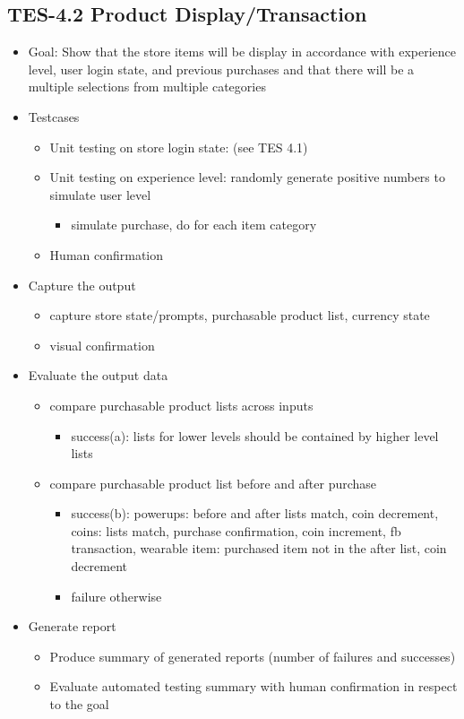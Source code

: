 \subsection{TES-4.2 Product Display/Transaction}
\begin{itemize}
\item Goal: Show that the store items will be display in accordance with experience level, user login state, and previous purchases and that there will be a multiple selections from multiple categories

\item Testcases
\begin{itemize}
\item Unit testing on store login state: (see TES 4.1)
\item Unit testing on experience level: randomly generate positive numbers to simulate user level
\begin{itemize}
\item simulate purchase, do for each item category
\end{itemize}
\item Human confirmation
\end{itemize}

\item Capture the output
\begin{itemize}
\item capture store state/prompts, purchasable product list, currency state
\item visual confirmation
\end{itemize}

\item Evaluate the output data
\begin{itemize}
\item compare purchasable product lists across inputs
\begin{itemize}
\item success(a): lists for lower levels should be contained by higher level lists
\end{itemize}
\item compare purchasable product list before and after purchase
\begin{itemize}
\item success(b): powerups: before and after lists match, coin decrement, coins: lists match, purchase confirmation, coin increment, fb transaction, wearable item:	 purchased item not in the after list, coin decrement
\item failure otherwise
\end{itemize}
\end{itemize}

\item Generate report
\begin{itemize}
\item Produce summary of generated reports (number of failures and successes)
\item Evaluate automated testing summary with human confirmation in respect to the goal
\end{itemize}
\end{itemize}


